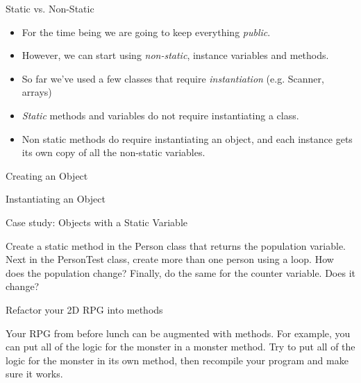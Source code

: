 \begin{frame}{Static vs. Non-Static}
\begin{itemize}
\item For the time being we are going to keep everything \emph{public}.
\item However, we can start using \emph{non-static}, instance variables and methods. \pause
\item So far we've used a few classes that require \emph{instantiation} (e.g. Scanner, arrays) \pause
\item \emph{Static} methods and variables do not require instantiating a class.
\item Non static methods do require instantiating an object, and each instance gets its own copy of all the non-static variables.
\end{itemize}
\end{frame}

\begin{frame}[fragile]{Creating an Object}
\begin{semiverbatim}\end{semiverbatim}
\end{frame}

\begin{frame}[fragile]{Instantiating an Object}
\begin{semiverbatim}\end{semiverbatim}
\end{frame}

\begin{frame}{Case study: Objects with a Static Variable}
\begin{center}
Create a static method in the Person class that returns the population variable. Next in the PersonTest class, create more than one person using a loop. How does the population change? Finally, do the same for the counter variable. Does it change?
\end{center}
\end{frame}

\begin{frame}{Refactor your 2D RPG into methods}
\begin{center}
Your RPG from before lunch can be augmented with methods. For example, you can put all of the logic for the monster in a monster method. Try to put all of the logic for the monster in its own method, then recompile your program and make sure it works.\\
\end{center}
\end{frame}

